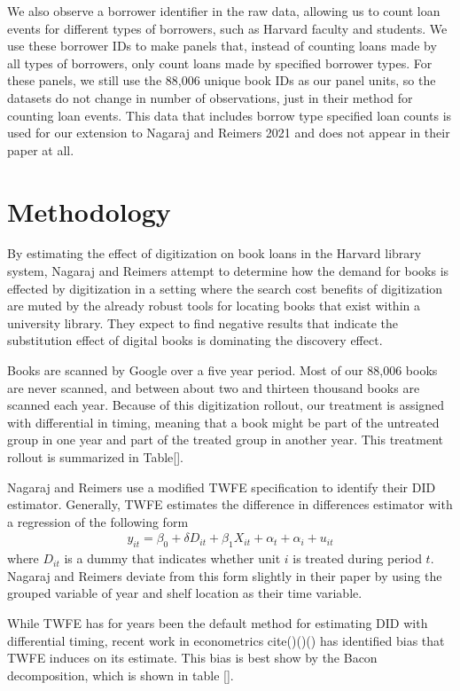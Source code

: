 \documentclass{article}
\begin{document}
We also observe a borrower identifier in the raw data, allowing us to count loan events for different types of borrowers, such as Harvard faculty and students. We use these borrower IDs to make panels that, instead of counting loans made by all types of borrowers, only count loans made by specified borrower types. For these panels, we still use the 88,006 unique book IDs as our panel units, so the datasets do not change in number of observations, just in their method for counting loan events. This data that includes borrow type specified loan counts is used for our extension to Nagaraj and Reimers 2021 and does not appear in their paper at all. 

\section{Methodology}
By estimating the effect of digitization on book loans in the Harvard library system, Nagaraj and Reimers attempt to determine how the demand for books is effected by digitization in a setting where the search cost benefits of digitization are muted by the already robust tools for locating books that exist within a university library. They expect to find negative results that indicate the substitution effect of digital books is dominating the discovery effect. 

Books are scanned by Google over a five year period. Most of our 88,006 books are never scanned, and between about two and thirteen thousand books are scanned each year. Because of this digitization rollout, our treatment is assigned with differential in timing, meaning that a book might be part of the untreated group in one year and part of the treated group in another year. This treatment rollout is summarized in Table[].

Nagaraj and Reimers use a modified TWFE specification to identify their DID estimator.  Generally, TWFE estimates the difference in differences estimator with a regression of the following form
\begin{align}
	y_{it} = \beta_0 + \delta D_{it} + \beta_1X_{it} + \alpha_t  +  \alpha_i + u_{it}
\end{align}
where $D_{it}$ is a dummy that indicates whether unit $i$ is treated during period $t$. Nagaraj and Reimers deviate from this form slightly in their paper by using the grouped variable of year and shelf location as their time variable.

While TWFE has for years been the default method for estimating DID with differential timing, recent work in econometrics cite()()() has identified bias that TWFE induces on its estimate. This bias is best show by the Bacon decomposition, which is shown in table []. 
\end{document}

